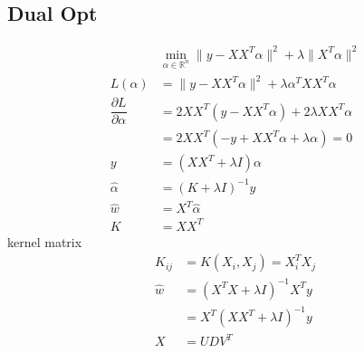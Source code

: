 \documentclass{article}
\begin{document}
\subsection{Dual Opt}
\begin{align*}
&  \displaystyle\min_{\alpha \in \mathbb{R}^{n}} \| y - X X^{T} \alpha \|^{2} + \lambda \| X^{T} \alpha \|^{2}
\\ L\left(\alpha\right)  &= \| y - X X^{T} \alpha \|^{2} + \lambda \alpha^{T} X X^{T} \alpha
\\ \dfrac{\partial L }{\partial \alpha} &= 2 X X^{T} \left(y - X X^{T} \alpha\right) + 2 \lambda X X^{T} \alpha
\\ &= 2 X X^{T} \left(-y + X X^{T} \alpha + \lambda \alpha\right) = 0
\\ y &= \left(X X^{T} + \lambda I\right) \alpha
\\ \hat{\alpha} &= \left(K + \lambda I\right)^{-1} y 
\\ \hat{w} &= X^{T} \hat{\alpha}
\\ K  &= X X^{T}
\end{align*}
kernel matrix
\begin{align*}
K_{ij} &= K\left(X_{i}, X_{j}\right) = X_{i}^{T} X_{j}
\\ \hat{w} &= \left(X^{T} X + \lambda I\right)^{-1} X^{T} y 
\\ &= X^{T} \left(X X^{T} + \lambda I\right)^{-1} y 
\\ X  &= U D V^{T}
\end{align*}
\end{document}
